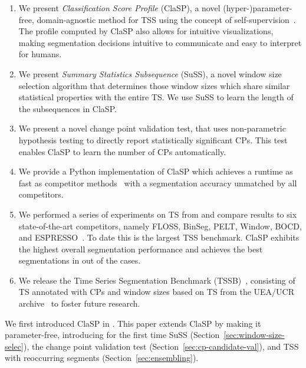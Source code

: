 \documentclass[pdflatex,sn-basic]{sn-jnl}
\begin{document}
\begin{enumerate}
    \item We present \emph{Classification Score Profile} (ClaSP), a novel (hyper-)parameter-free, domain-agnostic method for TSS using the concept of self-supervision~\citep{tsai2020demystifying}. The profile computed by ClaSP also allows for intuitive visualizations, making segmentation decisions intuitive to communicate and easy to interpret for humans.
    
    \item We present \emph{Summary Statistics Subsequence} (SuSS), a novel window size selection algorithm that determines those window sizes which share similar statistical properties with the entire TS. We use SuSS to learn the length of the subsequences in ClaSP.

    \item We present a novel change point validation test, that uses non-parametric hypothesis testing to directly report statistically significant CPs. This test enables ClaSP to learn the number of CPs automatically.

    \item We provide a Python implementation of ClaSP which achieves a runtime as fast as competitor methods~\citep{ClaSPWebpage} with a segmentation accuracy unmatched by all competitors.
    
    \item We performed a series of experiments on  TS from \citep{TSSBWebpage,gharghabi2017matrix} and compare results to six state-of-the-art competitors, namely FLOSS, BinSeg, PELT, Window, BOCD, and ESPRESSO~\citep{gharghabi2017matrix,truong2020selective,adams2007bayesian,Deldari2020ESPRESSOEA}. To date this is the largest TSS benchmark. ClaSP exhibits the highest overall segmentation performance and achieves the best segmentations in  out of the  cases.
    
    \item We release the Time Series Segmentation Benchmark (TSSB)~\citep{TSSBWebpage}, consisting of  TS annotated with CPs and window sizes based on TS from the UEA/UCR  archive~\citep{UCRClassification} to foster future research.
\end{enumerate}

We first introduced ClaSP in \citep{Schfer2021ClaSPT}. This paper extends ClaSP by making it parameter-free, introducing for the first time SuSS (Section~\ref{sec:window-size-selec}), the change point validation test (Section~\ref{sec:cp-candidate-val}), and TSS with reoccurring segments (Section~\ref{sec:ensembling}).
\end{document}
